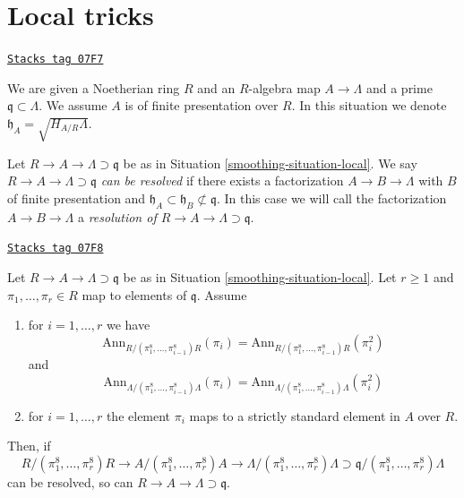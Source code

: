 \section{Local tricks}
\label{smoothing-section-local}
\begin{definition}
\label{smoothing-situation-local}
\href{https://stacks.math.columbia.edu/tag/07F7}{\texttt{Stacks tag 07F7}}

We are given a Noetherian ring $R$ and an $R$-algebra map $A \to \Lambda$
and a prime $\mathfrak q \subset \Lambda$. We assume $A$ is of
finite presentation over $R$. In this situation we denote
$\mathfrak h_A = \sqrt{H_{A/R} \Lambda}$.
\end{definition}

Let $R \to A \to \Lambda \supset \mathfrak q$ be as in
Situation \ref{smoothing-situation-local}. We say
{\it $R \to A \to \Lambda \supset \mathfrak q$
can be resolved} if there exists a factorization $A \to B \to \Lambda$
with $B$ of finite presentation and
$\mathfrak h_A \subset \mathfrak h_B \not \subset \mathfrak q$.
In this case we will call the factorization $A \to B \to \Lambda$
a {\it resolution of $R \to A \to \Lambda \supset \mathfrak q$}.

\begin{lemma}
\label{smoothing-lemma-lift-solution}
\href{https://stacks.math.columbia.edu/tag/07F8}{\texttt{Stacks tag 07F8}}

Let $R \to A \to \Lambda \supset \mathfrak q$ be as in
Situation \ref{smoothing-situation-local}. Let $r \geq 1$ and
$\pi_1, \ldots, \pi_r \in R$ map to elements of $\mathfrak q$. Assume
\begin{enumerate}
\item for $i = 1, \ldots, r$ we have
$$
\text{Ann}_{R/(\pi_1^8, \ldots, \pi_{i - 1}^8)R}(\pi_i)
=
\text{Ann}_{R/(\pi_1^8, \ldots, \pi_{i - 1}^8)R}(\pi_i^2)
$$
and
$$
\text{Ann}_{\Lambda/(\pi_1^8, \ldots, \pi_{i - 1}^8)\Lambda}(\pi_i)
=
\text{Ann}_{\Lambda/(\pi_1^8, \ldots, \pi_{i - 1}^8)\Lambda}(\pi_i^2)
$$
\item for $i = 1, \ldots, r$ the element $\pi_i$ maps to a strictly
standard element in $A$ over $R$.
\end{enumerate}
Then, if
$$
R/(\pi_1^8, \ldots, \pi_r^8)R \to A/(\pi_1^8, \ldots, \pi_r^8)A
\to \Lambda/(\pi_1^8, \ldots, \pi_r^8)\Lambda \supset
\mathfrak q/(\pi_1^8, \ldots, \pi_r^8)\Lambda
$$
can be resolved, so can $R \to A \to \Lambda \supset \mathfrak q$.
\end{lemma}

